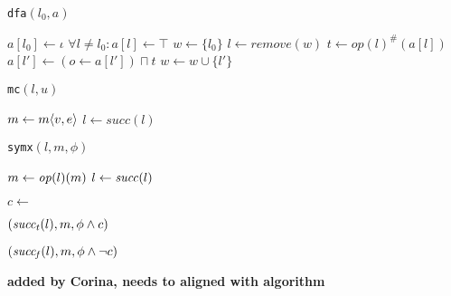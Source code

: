 \noindent\begin{minipage}[t]{0.32\textwidth}
\begin{algorithm}[H]
\renewcommand{\algorithmicindent}{0.6em}
\caption{{\tt dfa}$(l_0,a)$}
\label{alg-dfa}
\begin{algorithmic}
 \STATE $a[l_0] \gets \iota$
 \STATE $\forall l \not= l_0 : a[l] \gets \top$
 \STATE $w \gets \{l_0\}$
   \STATE $l \gets remove(w)$
   \STATE $t \gets {op(l)}^{\#}(a[l])$
     \STATE $a[l'] \gets (o \gets a[l']) \sqcap t$
       \STATE $w \gets w \cup \{l'\}$
     \ENDIF
   \ENDFOR
 \ENDWHILE
\end{algorithmic}
\end{algorithm}
\end{minipage}%
\hfill
\begin{minipage}[t]{0.32\textwidth}
\begin{algorithm}[H]
\renewcommand{\algorithmicindent}{0.6em}
\caption{{\tt mc}$(l,u)$}
\label{alg-mc}
\begin{algorithmic}
   \STATE $m \gets m\langle v, e\rangle$
   \STATE $l \gets succ(l)$
 \ENDWHILE
\end{algorithmic}
\end{algorithm}
\end{minipage}%
\hfill
\begin{minipage}[t]{0.32\textwidth}
\begin{algorithm}[H]
\renewcommand{\algorithmicindent}{0.6em}
\caption{{\tt symx}$(l,m,\phi)$}
\label{alg-symexe}
\begin{algorithmic}
   \STATE $m \gets \mathit{op}(l)(m)$
   \STATE $l \gets \mathit{succ}(l)$
 \ENDWHILE

 \STATE $c \gets $

   $(\mathit{succ_t}(l), m, \phi \wedge c)$
 \ENDIF

   $(\mathit{succ_f}(l), m, \phi \wedge \neg c)$
 \ENDIF
\end{algorithmic}
\end{algorithm}
\end{minipage}

{\bf added by Corina, needs to aligned with algorithm}

